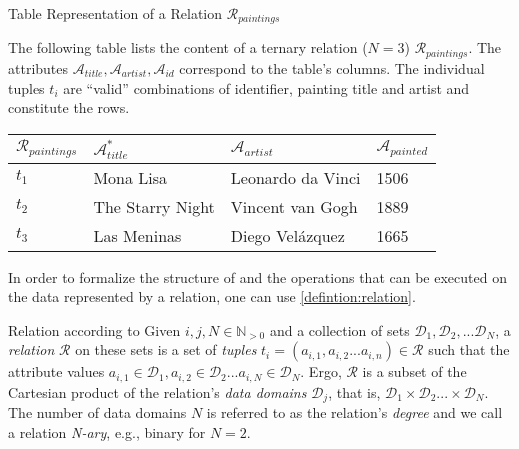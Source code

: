 \begin{example}[label=example:relational_table]{Table Representation of a Relation $\mathcal{R}_{paintings}$}{}
    
    The following table lists the content of a ternary relation ($N = 3$) $\mathcal{R}_{paintings}$. The attributes $\mathcal{A}_{title}, \mathcal{A}_{artist}, \mathcal{A}_{id}$ correspond to the table's columns. The individual tuples $t_i$ are ``valid'' combinations of identifier, painting title and artist and constitute the rows.
        
    \begin{center}
        \begin{tabular}{ l || l | l | l |}
            $\mathcal{R}_{paintings}$ & $\mathcal{A}^{*}_{title}$  & $\mathcal{A}_{artist}$  & $\mathcal{A}_{painted}$ \\ 
            \hline
            \hline
            $t_1$ & Mona Lisa &  Leonardo da Vinci & 1506 \\
            \hline
            $t_2$ & The Starry Night & Vincent van Gogh & 1889 \\
            \hline
            $t_3$ & Las Meninas & Diego Velázquez & 1665 \\
            \hline
        \end{tabular}
    \end{center}
\end{example}

In order to formalize the structure of and the operations that can be executed on the data represented by a relation, one can use \cref{defintion:relation}. 

\begin{definition}[label=defintion:relation]{Relation according to \cite{Codd:1970Relational}}{}
    Given $i,j,N \in \mathbb{N}_{> 0}$ and a collection of sets $\mathcal{D}_1, \mathcal{D}_2, ... \mathcal{D}_N$, a \emph{relation} $\mathcal{R}$ on these sets is a set of \emph{tuples} $t_i = (a_{i,1}, a_{i,2} ... a_{i,n}) \in \mathcal{R}$ such that the attribute values $a_{i,1} \in \mathcal{D}_1, a_{i,2} \in \mathcal{D}_2 ... a_{i,N} \in \mathcal{D}_N$. Ergo, $\mathcal{R}$ is a subset of the Cartesian product of the relation's \emph{data domains} $\mathcal{D}_j$, that is, $\mathcal{D}_1 \times \mathcal{D}_2 ... \times \mathcal{D}_N$. The number of data domains $N$ is referred to as the relation's \emph{degree} and we call a relation \emph{N-ary}, e.g., binary for $N=2$. 
\end{definition}


